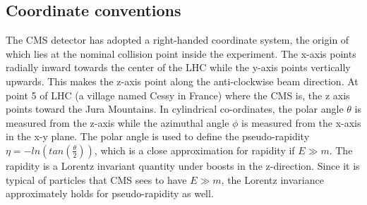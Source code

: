 \subsection{Coordinate conventions}
\label{cor_conv}
The CMS detector has adopted a right-handed coordinate system, the origin of which lies at the nominal collision point inside the experiment. The x-axis points radially inward towards the center of the LHC while the y-axis points vertically upwards. This makes the z-axis point along the anti-clockwise beam direction. At point 5 of LHC (a village named Cessy in France) where the CMS is, the z axis points toward the Jura Mountains. In cylindrical co-ordinates, the polar angle $\theta$ is measured from the z-axis while the azimuthal angle $\phi$ is measured from the x-axis in the x-y plane. The polar angle is used to define the pseudo-rapidity $\eta =-ln(tan(\frac{\theta}{2}))$, which is a close approximation for rapidity if $E\gg m$. The rapidity is a Lorentz invariant quantity under boosts in the z-direction. Since it is typical of particles that CMS sees to have $E\gg m$, the Lorentz invariance approximately holds for pseudo-rapidity as well. 


